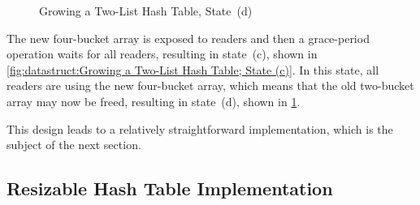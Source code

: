 \begin{figure}[tb]
\centering
{}
\caption{Growing a Two-List Hash Table, State~(d)}
\label{fig:datastruct:Growing a Two-List Hash Table; State (d)}
\end{figure}

The new four-bucket array is exposed to readers and then a grace-period
operation waits for all readers, resulting in state~(c), shown in
\cref{fig:datastruct:Growing a Two-List Hash Table; State (c)}.
In this state, all readers are using the new four-bucket array,
which means that the old two-bucket array may now be freed, resulting
in state~(d), shown in
\cref{fig:datastruct:Growing a Two-List Hash Table; State (d)}.

This design leads to a relatively straightforward implementation,
which is the subject of the next section.

\subsection{Resizable Hash Table Implementation}
\label{sec:datastruct:Resizable Hash Table Implementation}


